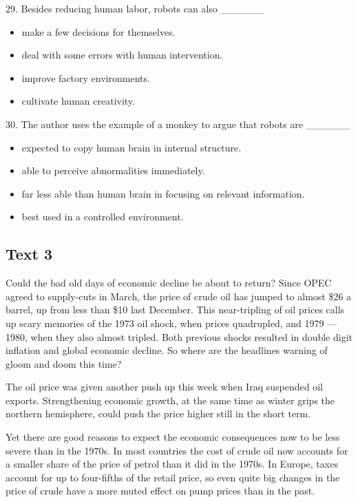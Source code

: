 \documentclass[UTF8,11pt]{ctexart}
\begin{document}
29. Besides reducing human labor, robots can also \_\_\_\_\_\_


\begin{itemize}[leftmargin=2em,itemsep=.2em,topsep=.4em]\item[A.] make a few decisions for themselves.
\item[B.] deal with some errors with human intervention.
\item[C.] improve factory environments.
\item[D.] cultivate human creativity.
\end{itemize}

30. The author uses the example of a monkey to argue that robots are \_\_\_\_\_\_


\begin{itemize}[leftmargin=2em,itemsep=.2em,topsep=.4em]\item[A.] expected to copy human brain in internal structure.
\item[B.] able to perceive abnormalities immediately.
\item[C.] far less able than human brain in focusing on relevant information.
\item[D.] best used in a controlled environment.
\end{itemize}

\subsection*{\textbf{Text 3}}


Could the bad old days of economic decline be about to return? Since OPEC agreed to supply-cuts in March, the price of crude oil has jumped to almost \$26 a barrel, up from less than \$10 last December. This near-tripling of oil prices calls up scary memories of the 1973 oil shock, when prices quadrupled, and 1979 — 1980, when they also almost tripled. Both previous shocks resulted in double digit inflation and global economic decline. So where are the headlines warning of gloom and doom this time?


The oil price was given another push up this week when Iraq suspended oil exports. Strengthening economic growth, at the same time as winter grips the northern hemisphere, could push the price higher still in the short term.


Yet there are good reasons to expect the economic consequences now to be less severe than in the 1970s. In most countries the cost of crude oil now accounts for a smaller share of the price of petrol than it did in the 1970s. In Europe, taxes account for up to four-fifths of the retail price, so even quite big changes in the price of crude have a more muted effect on pump prices than in the past.
\end{document}
